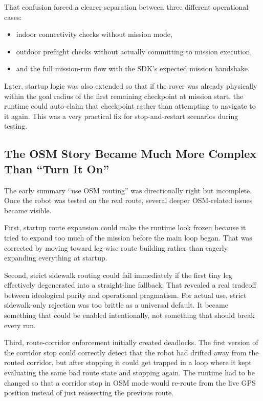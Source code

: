 \documentclass[11pt]{article}
\begin{document}
That confusion forced a clearer separation between three different operational cases:
\begin{itemize}[leftmargin=*]
\item indoor connectivity checks without mission mode,
\item outdoor preflight checks without actually committing to mission execution,
\item and the full mission-run flow with the SDK's expected mission handshake.
\end{itemize}

Later, startup logic was also extended so that if the rover was already physically within the goal radius of the first remaining checkpoint at mission start, the runtime could auto-claim that checkpoint rather than attempting to navigate to it again. This was a very practical fix for stop-and-restart scenarios during testing.

\subsection{The OSM Story Became Much More Complex Than ``Turn It On''}
The early summary ``use OSM routing'' was directionally right but incomplete. Once the robot was tested on the real route, several deeper OSM-related issues became visible.

First, startup route expansion could make the runtime look frozen because it tried to expand too much of the mission before the main loop began. That was corrected by moving toward leg-wise route building rather than eagerly expanding everything at startup.

Second, strict sidewalk routing could fail immediately if the first tiny leg effectively degenerated into a straight-line fallback. That revealed a real tradeoff between ideological purity and operational pragmatism. For actual use, strict sidewalk-only rejection was too brittle as a universal default. It became something that could be enabled intentionally, not something that should break every run.

Third, route-corridor enforcement initially created deadlocks. The first version of the corridor stop could correctly detect that the robot had drifted away from the routed corridor, but after stopping it could get trapped in a loop where it kept evaluating the same bad route state and stopping again. The runtime had to be changed so that a corridor stop in OSM mode would re-route from the live GPS position instead of just reasserting the previous route.
\end{document}
